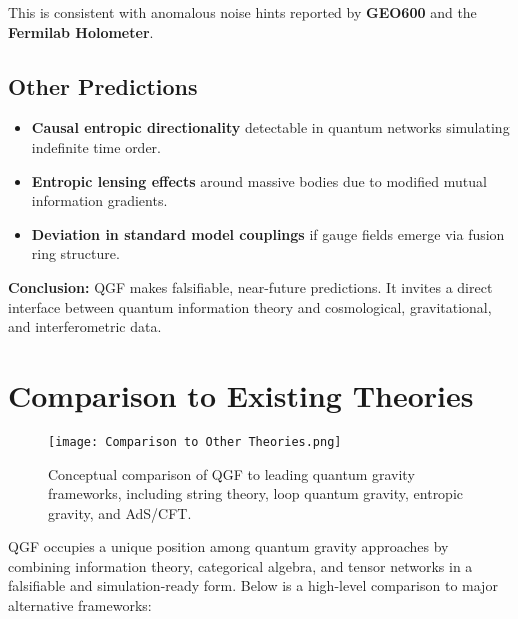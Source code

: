 \documentclass[11pt]{article}
\begin{document}
This is consistent with anomalous noise hints reported by \textbf{GEO600} and the \textbf{Fermilab Holometer}.

\subsection{Other Predictions}

\begin{itemize}
    \item \textbf{Causal entropic directionality} detectable in quantum networks simulating indefinite time order.
    \item \textbf{Entropic lensing effects} around massive bodies due to modified mutual information gradients.
    \item \textbf{Deviation in standard model couplings} if gauge fields emerge via fusion ring structure.
\end{itemize}

\textbf{Conclusion:} QGF makes falsifiable, near-future predictions. It invites a direct interface between quantum information theory and cosmological, gravitational, and interferometric data.



\section{Comparison to Existing Theories}

\begin{figure}[h!]
\centering
\texttt{[image: Comparison to Other Theories.png]}
\caption{Conceptual comparison of QGF to leading quantum gravity frameworks, including string theory, loop quantum gravity, entropic gravity, and AdS/CFT.}
\label{fig:qgf_comparison}
\end{figure}


QGF occupies a unique position among quantum gravity approaches by combining information theory, categorical algebra, and tensor networks in a falsifiable and simulation-ready form. Below is a high-level comparison to major alternative frameworks:
\end{document}

